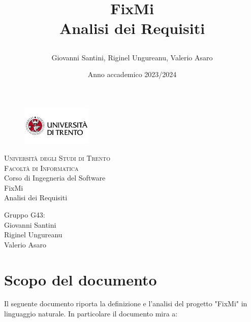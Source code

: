 \documentclass{report}
\title{

	FixMi \\
	Analisi dei Requisiti
}
\author{Giovanni Santini, Riginel Ungureanu, Valerio Asaro}
\date{Anno accademico 2023/2024}
\begin{document}
\begin{titlepage}
	\begin{figure}[t]
		\centering\includegraphics[width=0.3\textwidth]{images/unitn-logo}
	\end{figure}
	\begin{center}
		\textsc{ \LARGE{Università degli Studi di Trento \\}}
		\textsc{ \LARGE{Facoltà di Informatica\\ }}
		\textnormal{ \LARGE{Corso di Ingegneria del Software\\}}
		\vspace{30mm}
		\fontsize{10mm}{7mm}\selectfont 
		\textup{FixMi \\ Analisi dei Requisiti}\\
	\end{center}
	
	\vspace{25mm}
	
	\centering
	\large Gruppo G43:\\ Giovanni Santini \\ Riginel Ungureanu \\ Valerio Asaro
	
	\vspace{20mm}
	
	
\end{titlepage}


\pagestyle{fancy}
\fancyhead[R]{\chaptername\ \thechapter}  %

\tableofcontents
\newpage





\section{Scopo del documento}
Il seguente documento riporta la definizione e l'analisi del progetto "FixMi" in linguaggio naturale.
In particolare il documento mira a:
\end{document}
